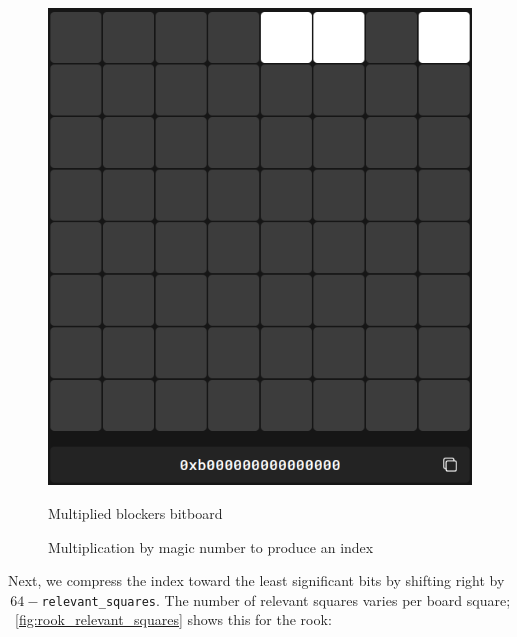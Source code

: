 \begin{figure}
\begin{minipage}[c]{0.4\textwidth}
        \includegraphics[width=\textwidth]{Imagenes/magics_multiplied_blockers.png}
        \caption{Multiplied blockers bitboard}
    \end{minipage}
    \caption{Multiplication by magic number to produce an index}\label{fig:magic_multiplication}
\end{figure}

\noindent Next, we compress the index toward the least significant bits by shifting right by \(\,64-\)\texttt{relevant\_squares}. The number of relevant squares varies per board square; ~\ref{fig:rook_relevant_squares} shows this for the rook:

\vspace{1em}

